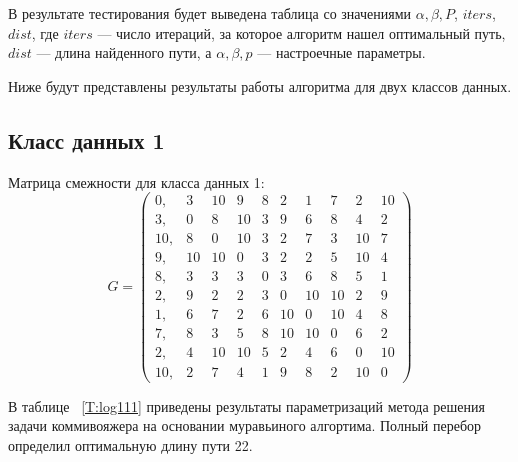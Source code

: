 \documentclass[a4paper,14pt]{extreport}
\begin{document}
В результате тестирования будет выведена таблица со значениями $\alpha, \beta, P$, $iters$, $ dist$, где $iters$ — число итераций, за которое алгоритм нашел оптимальный путь, $dist$ — длина найденного пути, а $\alpha, \beta, p$ — настроечные параметры.

Ниже будут представлены результаты работы алгоритма для двух классов данных.

\subsection{Класс данных 1}

Матрица смежности для класса данных 1:
\begin{equation*}
	G = \begin{pmatrix}
		0,      &3      &10     &9      &8      &2      &1      &7      &2      &10     \\
		3,      &0      &8      &10     &3      &9      &6      &8      &4      &2      \\
		10,     &8      &0      &10     &3      &2      &7      &3      &10     &7      \\
		9,      &10     &10     &0      &3      &2      &2      &5      &10     &4      \\
		8,      &3      &3      &3      &0      &3      &6      &8      &5      &1      \\
		2,      &9      &2      &2      &3      &0      &10     &10     &2      &9      \\
		1,      &6      &7      &2      &6      &10     &0      &10     &4      &8      \\
		7,      &8      &3      &5      &8      &10     &10     &0      &6      &2      \\
		2,      &4      &10     &10     &5      &2      &4      &6      &0      &10     \\
		10,     &2      &7      &4      &1      &9      &8      &2      &10     &0
	\end{pmatrix}
\end{equation*}

В таблице ~\ref{T:log111} приведены результаты параметризаций метода решения задачи коммивояжера на основании муравьиного алгортима. Полный перебор определил оптимальную длину пути 22.
\end{document}
